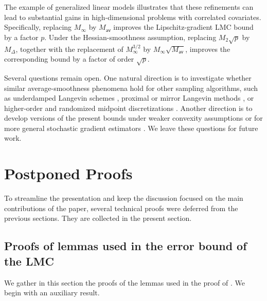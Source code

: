 \documentclass[aos,reqno]{imsart}
\def\Mav{M_{\textsf{av}}}
\def\Mmax{M_{\infty}}
\theoremstyle{definition}
\begin{document}
The example of generalized linear models illustrates that 
these refinements can lead to substantial gains in 
high-dimensional problems with correlated covariates. 
Specifically, replacing $\Mmax$ by $\Mav$ improves the
Lipschitz-gradient LMC bound by a factor $p$.
Under the Hessian-smoothness assumption, replacing
$M_2\sqrt p$ by $M_\Delta$, together with the replacement
of $\Mmax^{3/2}$ by $\Mmax\sqrt{\Mav}$, improves the
corresponding bound by a factor of order $\sqrt p$. 

Several questions remain open. One natural direction is
to investigate whether similar average-smoothness
phenomena hold for other sampling algorithms, such as
underdamped Langevin schemes \citep{cheng2018a,
dalalyan_riou_2018,zhang2023improved},
proximal or mirror Langevin methods
\citep{durmus2018efficient,brosse2017proximal,
ahn2021efficient,chen22c}, or higher-order and
randomized midpoint discretizations
\citep{shen2019randomized,he2020ergodicity,Mou21,
yu2025parallel}. Another direction is to
develop versions of the present bounds under weaker
convexity assumptions or for more general stochastic
gradient estimators \citep{raginsky2017nonconvex,
cheng20e,ma2015complete}. We leave these questions for
future work.

\section{Postponed Proofs}\label{Sec:proofs}

To streamline the presentation and keep the discussion
focused on the main contributions of the paper, several
technical proofs were deferred from the previous 
sections. They are collected in the present section.

\subsection{Proofs of lemmas used in the error bound of 
the LMC}

We gather in this section the proofs of the lemmas used 
in the proof of . We begin with an auxiliary 
result.
\end{document}
